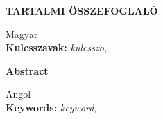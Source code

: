\thispagestyle{empty}
	
\begin{center}
	\Large
	\textbf{TARTALMI ÖSSZEFOGLALÓ}
\end{center}
\vspace{5pt}
	
	Magyar\\

\textbf{Kulcsszavak:} \textit{kulcsszo, }
	
	
\newpage



\thispagestyle{empty}

\begin{center}
	\Large
	\textbf{Abstract}
\end{center}
\vspace{5pt}

	Angol \\
	
\textbf{Keywords:} \textit{keyword, }
	
\newpage
